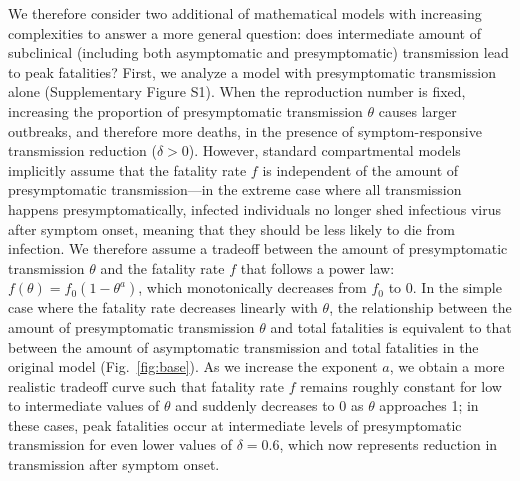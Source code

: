 \documentclass[12pt]{article}
\newcommand{\fref}[1]{Fig.~\ref{fig:#1}}
\begin{document}
We therefore consider two additional of mathematical models with increasing complexities to answer a more general question:
does intermediate amount of subclinical (including both asymptomatic and presymptomatic) transmission lead to peak fatalities?
First, we analyze a model with presymptomatic transmission alone (Supplementary Figure S1).
When the reproduction number is fixed, increasing the proportion of presymptomatic transmission $\theta$ causes larger outbreaks, and therefore more deaths, in the presence of symptom-responsive transmission reduction ($\delta > 0$).
However, standard compartmental models implicitly assume that the fatality rate $f$ is independent of the amount of presymptomatic transmission---in the extreme case where all transmission happens presymptomatically, infected individuals no longer shed infectious virus after symptom onset, meaning that they should be less likely to die from infection.
We therefore assume a tradeoff between the amount of presymptomatic transmission $\theta$ and the fatality rate $f$ that follows a power law: $f(\theta) = f_0 (1-\theta^a)$, which monotonically decreases from $f_0$ to 0.
In the simple case where the fatality rate decreases linearly with $\theta$, the relationship between the amount of presymptomatic transmission $\theta$ and total fatalities is equivalent to that between the amount of asymptomatic transmission and total fatalities in the original model (\fref{base}).
As we increase the exponent $a$, we obtain a more realistic tradeoff curve such that fatality rate $f$ remains roughly constant for low to intermediate values of $\theta$ and suddenly decreases to $0$ as $\theta$ approaches 1;
in these cases, peak fatalities occur at intermediate levels of presymptomatic transmission for even lower values of $\delta=0.6$, which now represents reduction in transmission after symptom onset.
\end{document}
